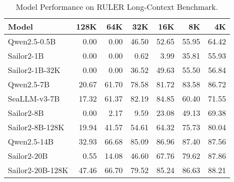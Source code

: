 \begin{table}[ht]
\centering
\caption{Model Performance on RULER Long-Context Benchmark.}
\label{tab:ruler}
\renewcommand{\arraystretch}{1.2}  %
\begin{tabular}{lrrrrrr}
\toprule
\textbf{Model} & \textbf{128K} & \textbf{64K} & \textbf{32K} & \textbf{16K} & \textbf{8K} & \textbf{4K} \\
\midrule
\midrule
Qwen2.5-0.5B   & 0.00 & 0.00 & 46.50 & 52.65 & 55.95 & 64.42 \\
Sailor2-1B     & 0.00 & 0.00 &  0.62 &  3.99 & 35.81 & 55.93 \\
Sailor2-1B-32K & 0.00 & 0.00 & 36.52 & 49.63 & 55.50 & 56.84 \\
\midrule
\midrule
Qwen2.5-7B    & 20.67 & 61.70 & 78.58 & 81.72 & 83.58 & 86.72 \\
SeaLLM-v3-7B    & 17.32 & 61.37 & 82.19 & 84.85 & 60.40 & 71.55 \\
Sailor2-8B     &  0.00 &  2.17 &  9.59 & 23.08 & 49.13 & 69.38 \\
Sailor2-8B-128K & 19.94 & 41.57 & 54.61 & 64.32 & 75.73 & 80.04 \\

\midrule
\midrule
Qwen2.5-14B   & 32.93 & 66.68 & 85.09 & 86.96 & 87.40 & 87.56 \\
Sailor2-20B    &  0.55 & 14.08 & 46.60 & 67.76 & 79.62 & 87.86 \\
Sailor2-20B-128K & 47.46 & 66.70 & 79.52 & 85.24 & 86.63 & 88.21 \\
\bottomrule
\end{tabular}
\end{table}
